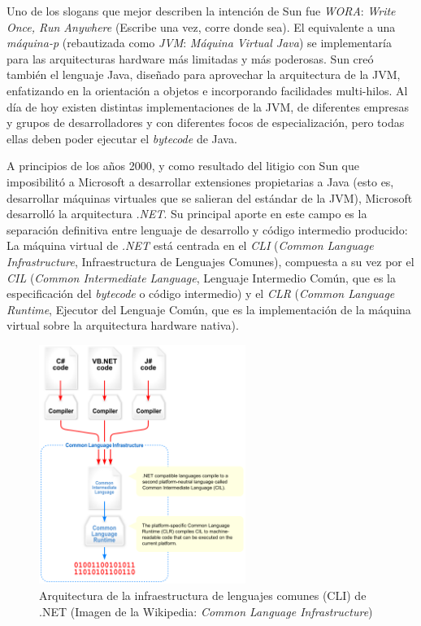 \documentclass[11pt,fleqn]{book} %
\begin{document}
Uno de los slogans que mejor describen la intención de Sun fue \emph{WORA}:
\emph{Write Once, Run Anywhere} (Escribe una vez, corre donde sea). El
equivalente a una \emph{máquina-p} (rebautizada como \emph{JVM}: \emph{Máquina Virtual Java}) se implementaría para las arquitecturas hardware más
limitadas y más poderosas. Sun creó también el lenguaje Java, diseñado
para aprovechar la arquitectura de la JVM, enfatizando en la
orientación a objetos e incorporando facilidades multi-hilos. Al día
de hoy existen distintas implementaciones de la JVM, de diferentes
empresas y grupos de desarrolladores y con diferentes focos de
especialización, pero todas ellas deben poder ejecutar el \emph{bytecode}
de Java.

A principios de los años 2000, y como resultado del litigio con Sun
que imposibilitó a Microsoft a desarrollar extensiones propietarias a
Java (esto es, desarrollar máquinas virtuales que se salieran del
estándar de la JVM), Microsoft desarrolló la arquitectura \emph{.NET}. Su
principal aporte en este campo es la separación definitiva entre
lenguaje de desarrollo y código intermedio producido: La máquina
virtual de \emph{.NET} está centrada en el \emph{CLI} (\emph{Common Language Infrastructure}, Infraestructura de Lenguajes Comunes), compuesta a su
vez por el \emph{CIL} (\emph{Common Intermediate Language}, Lenguaje Intermedio
Común, que es la especificación del \emph{bytecode} o código intermedio) y
el \emph{CLR} (\emph{Common Language Runtime}, Ejecutor del Lenguaje Común, que
es la implementación de la máquina virtual sobre la arquitectura
hardware nativa).

\begin{figure}[htb]
\centering
\includegraphics[width=0.6\textwidth]{./img/maquina_virtual_dotnet.png}
\caption{\label{VIRT_maquina_virtual_dotnet}Arquitectura de la infraestructura de lenguajes comunes (CLI) de .NET (Imagen de la Wikipedia: \emph{Common Language Infrastructure})}
\end{figure}
\end{document}
